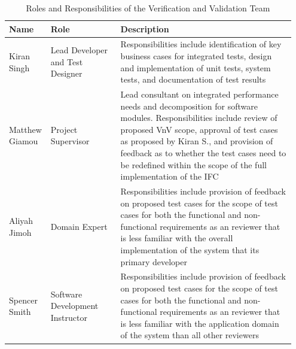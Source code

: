 \documentclass[12pt, titlepage]{article}
\begin{document}
\begin{table}[h!]
  \centering
  \begin{tabular}{|p{0.11\linewidth}|p{0.24\linewidth}|p{0.6\linewidth}|} 
    \hline
    \textbf{Name} & \textbf{Role} & \textbf{Description}\\
    \hline
    Kiran Singh & Lead Developer and Test Designer & Responsibilities include 
    identification of key business cases for integrated tests,  design and 
    implementation of unit tests, system tests, and documentation of test 
    results\\
    \hline
    Matthew Giamou & Project Supervisor & Lead consultant on integrated 
    performance needs and decomposition for software modules. Responsibilities 
    include review of proposed VnV scope, approval of test cases as proposed by 
    Kiran S., and provision of feedback as to whether the test cases need to be 
    redefined within the scope of the full implementation of the IFC\\
    \hline
    Aliyah Jimoh & Domain Expert & Responsibilities include provision of 
    feedback on proposed test cases for the 
    scope of test cases for both the functional and non-functional requirements 
    as an reviewer that is less familiar with the overall implementation of the 
    system that its primary developer\\
    \hline
    Spencer Smith & Software Development Instructor & Responsibilities include 
    provision of feedback on proposed test cases for the scope of test cases 
    for both the functional and non-functional requirements as an reviewer that 
    is less familiar with the application domain of the system than all other 
    reviewers\\
    \bottomrule
  \end{tabular}\\
  \caption{Roles and Responsibilities of the Verification and Validation Team}
  \label{Table_Ver_Roles}
\end{table}
\end{document}
